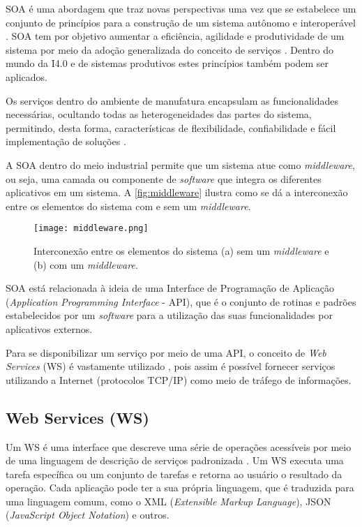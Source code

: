 SOA é uma abordagem que traz novas perspectivas uma vez que se estabelece um conjunto de princípios para a construção de um sistema autônomo e interoperável \cite{candido2009soa}. SOA tem por objetivo aumentar a eficiência, agilidade e produtividade de um sistema por meio da adoção generalizada do conceito de serviços \cite{souit2013soa}. Dentro do mundo da I4.0 e de sistemas produtivos estes princípios também podem ser aplicados.

Os serviços dentro do ambiente de manufatura encapsulam as funcionalidades necessárias, ocultando todas as heterogeneidades das partes do sistema, permitindo, desta forma, características de flexibilidade, confiabilidade e fácil implementação de	soluções \cite{groba2008soa}.

A SOA dentro do meio industrial permite que um sistema atue como \textit{middleware}, ou seja, uma camada ou componente de \textit{software} que integra os diferentes aplicativos em um sistema. A \autoref{fig:middleware} ilustra como se dá a interconexão entre os elementos do sistema com e sem um \textit{middleware}.

\begin{figure}[t]
	\centering
	\texttt{[image: middleware.png]}
	\caption{Interconexão entre os elementos do sistema (a) sem um \textit{middleware} e (b) com um \textit{middleware}.}
	\label{fig:middleware}
\end{figure}

SOA está relacionada à ideia de uma Interface de Programação de Aplicação (\textit{Application Programming Interface} - API), que é o conjunto de rotinas e padrões estabelecidos por um \textit{software} para a utilização das suas funcionalidades por aplicativos externos.

Para se disponibilizar um serviço por meio de uma API, o conceito de \textit{Web Services} (WS) é vastamente utilizado \cite{souit2013soa}, pois assim é possível fornecer serviços utilizando a Internet (protocolos TCP/IP) como meio de tráfego de informações.

\subsection{Web Services (WS)}
\label{sub:web-services}

Um WS é uma interface que descreve uma série de operações acessíveis por meio de uma linguagem de descrição de serviços padronizada \cite{gottschalk2002webservices}. Um WS executa uma tarefa específica ou um conjunto de tarefas e retorna ao usuário o resultado da operação. Cada aplicação pode ter a sua própria linguagem, que é traduzida para uma linguagem comum, como o XML (\textit{Extensible Markup Language}), JSON (\textit{JavaScript Object Notation}) e outros.

